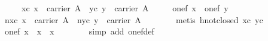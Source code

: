 \begin{isabellebody}
\ \ \ \ \ xc{}\ {}x\ {}\ carrier\ A{}\ \ yc{}\ {}y\ {}\ carrier\ A{}\isanewline
\ \ \ \ \ {}one{}f\ x\ {}\ one{}f\ y{}\isanewline
%
\isadelimproof
\ \ %
\endisadelimproof
%
\isatagproof
{}\isamarkupfalse%
\ {}\isanewline
\ \ \ \ \isamarkupfalse%
\ nxc{}\ {}{}x\ {}\ carrier\ A{}\ \ nyc{}\ {}{}y\ {}\ carrier\ A{}\isanewline
\ \ \ \ \ \ \isamarkupfalse%
\ {}metis\ hnot{}closed\ xc\ yc{}{}\isanewline
\ \ \ \ \isamarkupfalse%
\ {}one{}f\ x\ {}\ x\ {}\ {}x{}\isanewline
\ \ \ \ \ \ \isamarkupfalse%
\ {}simp\ add{}\ one{}f{}def{}\isanewline
\ \ \ \ \isamarkupfalse%
\ \isamarkupfalse%

\end{isabellebody}
